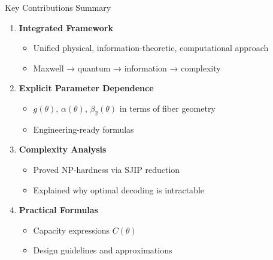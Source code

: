 \documentclass[10pt]{beamer}
\begin{document}
\begin{frame}{Key Contributions Summary}
\begin{enumerate}
\item \textbf{Integrated Framework}
\begin{itemize}
\item Unified physical, information-theoretic, computational approach
\item Maxwell → quantum → information → complexity
\end{itemize}

\item \textbf{Explicit Parameter Dependence}
\begin{itemize}
\item $g(\theta)$, $\alpha(\theta)$, $\beta_2(\theta)$ in terms of fiber geometry
\item Engineering-ready formulas
\end{itemize}

\item \textbf{Complexity Analysis}
\begin{itemize}
\item Proved NP-hardness via SJIP reduction
\item Explained why optimal decoding is intractable
\end{itemize}

\item \textbf{Practical Formulas}
\begin{itemize}
\item Capacity expressions $C(\theta)$
\item Design guidelines and approximations
\end{itemize}
\end{enumerate}
\end{frame}
\end{document}

